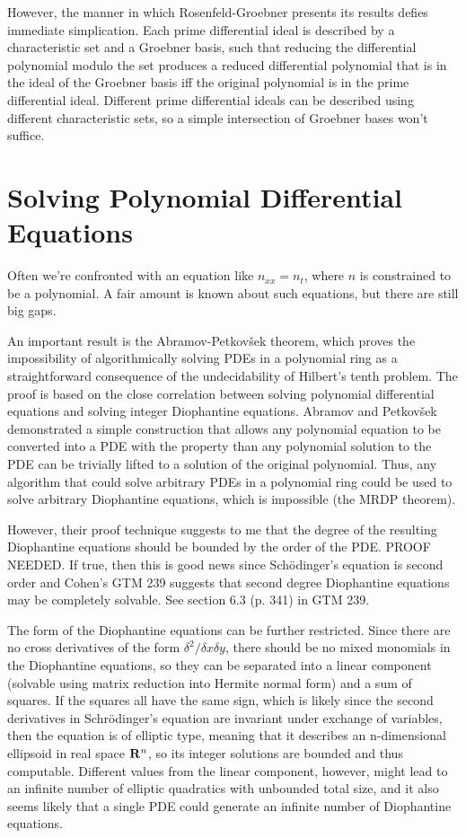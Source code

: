 \documentclass{article}
\newcommand{\R}{\ensuremath{{\bf R}}}
\begin{document}
However, the manner in which Rosenfeld-Groebner presents its results
defies immediate simplication.  Each prime differential ideal is
described by a characteristic set and a Groebner basis, such that
reducing the differential polynomial modulo the set produces a reduced
differential polynomial that is in the ideal of the Groebner basis iff
the original polynomial is in the prime differential ideal.  Different
prime differential ideals can be described using different
characteristic sets, so a simple intersection of Groebner bases won't
suffice.



\vfill\eject
\section*{Solving Polynomial Differential Equations}

Often we're confronted with an equation like $n_{xx} = n_t$, where $n$
is constrained to be a polynomial.  A fair amount is known about
such equations, but there are still big gaps.

An important result is the Abramov-Petkov\v sek theorem, which proves
the impossibility of algorithmically solving PDEs in a polynomial ring
as a straightforward consequence of the undecidability of Hilbert's
tenth problem.  The proof is based on the close correlation between
solving polynomial differential equations and solving integer Diophantine
equations.  Abramov and Petkov\v sek demonstrated a simple
construction that allows any polynomial equation to be converted
into a PDE with the property than any polynomial solution to the PDE
can be trivially lifted to a solution of the original polynomial.
Thus, any algorithm that could solve arbitrary PDEs in a polynomial
ring could be used to solve arbitrary Diophantine equations, which
is impossible (the MRDP theorem).

However, their proof technique suggests to me that the degree of the
resulting Diophantine equations should be bounded by the order of the
PDE.  PROOF NEEDED.  If true, then this is good news since Sch\"odinger's
equation is second order and Cohen's GTM 239 suggests that second
degree Diophantine equations may be completely solvable.  See
section 6.3 (p. 341) in GTM 239.

The form of the Diophantine equations can be further restricted.
Since there are no cross derivatives of the form $\delta^2/\delta x \delta y$,
there should be no mixed monomials in the Diophantine equations,
so they can be separated into a linear component (solvable using
matrix reduction into Hermite normal form) and a sum of squares.
If the squares all have the same sign, which is likely since
the second derivatives in Schr\" odinger's equation are invariant
under exchange of variables, then the equation is of elliptic
type, meaning that it describes an n-dimensional ellipsoid
in real space $\R^n$, so its integer solutions are bounded
and thus computable.  Different values from the linear
component, however, might lead to an infinite number of
elliptic quadratics with unbounded total size, and it
also seems likely that a single PDE could generate an
infinite number of Diophantine equations.
\end{document}
